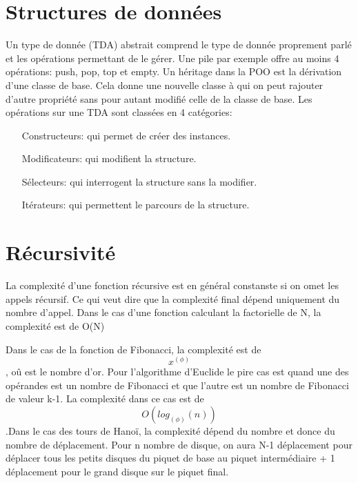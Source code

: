 \documentclass{article}
\begin{document}
\section{Structures de données}
Un type de donnée (TDA) abstrait comprend le type de donnée proprement parlé et les opérations permettant de le gérer.
Une pile par exemple offre au moins 4 opérations: push, pop, top et empty. 
Un héritage dans la POO est la dérivation d'une classe de base. Cela donne une nouvelle classe à qui on peut rajouter d'autre propriété sans pour autant modifié celle de la classe de base. 
Les opérations sur une TDA sont classées en 4 catégories:
\begin{itemize}
	\item[Constructeurs:] qui permet de créer des instances.
	\item[Modificateurs:] qui modifient la structure.
	\item[Sélecteurs:] qui interrogent la structure sans la modifier.
	\item[Itérateurs:] qui permettent le parcours de la structure. 
\end{itemize}

\section{Récursivité}
La complexité d'une fonction récursive est en général constanste si on omet les appels récursif. Ce qui veut dire que la complexité final dépend uniquement du nombre d'appel. Dans le cas d'une fonction calculant la factorielle de N, la complexité est de O(N)

Dans le cas de la fonction de Fibonacci, la complexité est de $$ x^(\phi) $$, oû \phi est le nombre d'or. Pour l'algorithme d'Euclide le pire cas est quand une des opérandes est un nombre de Fibonacci et que l'autre est un nombre de Fibonacci de valeur k-1. La complexité dans ce cas est de $$ O(log_(\phi)(n)) $$.Dans le cas des tours de Hanoï, la complexité dépend du nombre et donce du nombre de déplacement. Pour n nombre de disque, on aura N-1 déplacement pour déplacer tous les petits disques du piquet de base au piquet intermédiaire + 1 déplacement pour le grand disque sur le piquet final. 
\end{document}
